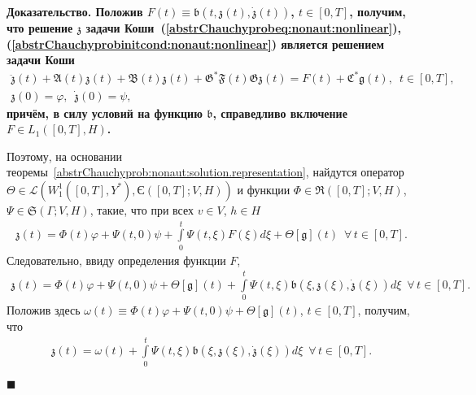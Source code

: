 \documentclass{report}
\newenvironment{Proof}{\par\noindent\bf Доказательство.\rm}{ $\blacksquare$\par}
\begin{document}
\begin{Proof}
Положив $F(t)\equiv\mathfrak{b}(t,\mathfrak{z}(t),\dot{\mathfrak{z}}(t))$, $t\in[0,T]$, получим, что решение $\mathfrak{z}$ задачи Коши~(\ref{abstrChauchyprobeq:nonaut:nonlinear}), (\ref{abstrChauchyprobinitcond:nonaut:nonlinear}) является решением задачи Коши
\begin{gather*}
\ddot{\mathfrak{z}}(t)+\mathfrak{A}(t){\mathfrak{z}}(t)+\mathfrak{B}(t){\mathfrak{z}}(t) + \mathfrak{G}^*\mathfrak{F}(t)\mathfrak{G}{\mathfrak{z}}(t) = F(t) + \mathfrak{C}^*\mathfrak{g}(t),\,\,\,t\in[0,T],\\
{\mathfrak{z}}(0)=\varphi,\,\,\,\dot{\mathfrak{z}}(0)=\psi,
\end{gather*}
причём, в силу условий на функцию $\mathfrak{b}$, справедливо включение $F\in L_1([0,T],H)$.

Поэтому, на основании теоремы~\ref{abstrChauchyprob:nonaut:solution.representation}, найдутся оператор $\Theta\in\mathcal{L}(W^1_1([0,T],Y^*),\textrm{Є}([0,T];V,H))$ и функции $\Phi\in\mathfrak{R}([0,T]; V,H)$, $\Psi\in\mathfrak{S}(\Gamma; V,H)$, такие, что при всех $v\in V$, $h\in H$
\begin{gather}\label{nonlinear.equation.solution.repres1}
\mathfrak{z}(t)=\Phi(t)\varphi+\Psi(t,0)\psi+\int\limits_0^t\Psi(t,\xi)F(\xi)d\xi+\Theta[\mathfrak{g}](t)\,\,\,\forall\,t\in[0,T].
\end{gather}
Следовательно, ввиду определения функции $F$,
\begin{gather}\label{nonlinear.equation.solution.repres2}
\mathfrak{z}(t)=\Phi(t)\varphi+\Psi(t,0)\psi+\Theta[\mathfrak{g}](t)+\int\limits_0^t\Psi(t,\xi)\mathfrak{b}(\xi,\mathfrak{z}(\xi),\dot{\mathfrak{z}}(\xi))d\xi\,\,\,\forall\,t\in[0,T].
\end{gather}
Положив здесь $\omega(t)\equiv\Phi(t)\varphi+\Psi(t,0)\psi+\Theta[\mathfrak{g}](t)$, $t\in[0,T]$, получим, что
\begin{gather}\label{nonlinear.equation.solution.repres3}
\mathfrak{z}(t)=\omega(t)+\int\limits_0^t\Psi(t,\xi)\mathfrak{b}(\xi,\mathfrak{z}(\xi),\dot{\mathfrak{z}}(\xi))d\xi\,\,\,\forall\,t\in[0,T].
\end{gather}


\end{Proof}
\end{document}
